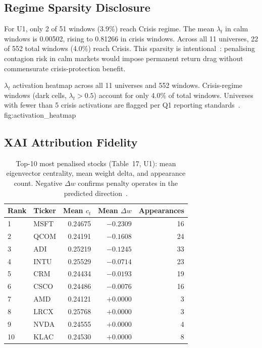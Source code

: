 \subsection{Regime Sparsity Disclosure}

For U1, only 2 of 51 windows (3.9\%) reach Crisis regime. The mean
$\lambda_t$ in calm windows is 0.00502, rising to 0.81266 in crisis
windows. Across all 11 universes, 22 of 552 total windows (4.0\%) reach
Crisis. This sparsity is intentional~\citep{ang2002,hamilton1989}:
penalising contagion risk in calm markets would impose permanent return
drag without commensurate crisis-protection benefit.

  {$\lambda_t$ activation heatmap across all 11 universes and 552
   windows. Crisis-regime windows (dark cells, $\lambda_t > 0.5$)
   account for only 4.0\% of total windows. Universes with fewer
   than 5 crisis activations are flagged per Q1 reporting
   standards~\citep{harvey2016}.}
  {fig:activation_heatmap}

\subsection{XAI Attribution Fidelity}

\begin{table}[H]
\centering
\caption{Top-10 most penalised stocks (Table~17, U1): mean eigenvector
         centrality, mean weight delta, and appearance count.
         Negative $\Delta w$ confirms penalty operates in the predicted
         direction~\citep{bonacich1987,arrieta2020}.}
\label{tab:top10_penalised}
\begin{tabular}{llrrr}
\toprule
Rank & Ticker & Mean $c_t$ & Mean $\Delta w$ & Appearances \\
\midrule
1  & MSFT & 0.24675 & $-0.2309$ & 16 \\
2  & QCOM & 0.24191 & $-0.1608$ & 24 \\
3  & ADI  & 0.25219 & $-0.1245$ & 33 \\
4  & INTU & 0.25529 & $-0.0714$ & 23 \\
5  & CRM  & 0.24434 & $-0.0193$ & 19 \\
6  & CSCO & 0.24486 & $-0.0076$ & 16 \\
7  & AMD  & 0.24121 & $+0.0000$ & 3  \\
8  & LRCX & 0.25768 & $+0.0000$ & 3  \\
9  & NVDA & 0.24555 & $+0.0000$ & 4  \\
10 & KLAC & 0.24530 & $+0.0000$ & 8  \\
\bottomrule
\end{tabular}
\end{table}


